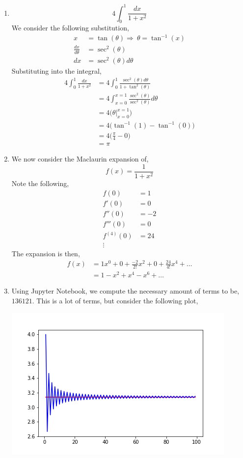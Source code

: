 \documentclass[letterpaper,10pt]{article}
\begin{document}
\begin{enumerate}
\begin{enumerate}
\item \[4\int_0^1\frac{dx}{1+x^2}\]
We consider the following substitution,
\begin{align*}
x&=\tan(\theta)\Rightarrow\ \theta=\tan^{-1}(x) \\
\frac{dx}{d\theta}&=\sec^2(\theta)\\
dx&=\sec^2(\theta)d\theta
\end{align*}
Substituting into the integral,
\begin{align*}
4\int_0^1\frac{dx}{1+x^2} &= 4\int_0^1\frac{\sec^2(\theta)d\theta}{1+\tan^2(\theta)}\\
&=4\int_{x=0}^{x=1}\frac{\sec^2(\theta)}{\sec^2(\theta)}d\theta\\
&=4\bigg(\theta\big|_{x=0}^{x=1}\bigg)\\
&=4\big(\tan^{-1}(1)-\tan^{-1}(0)\big)\\
&=4\bigg(\frac{\pi}{4}-0\bigg)\\
&=\pi
\end{align*}
\item We now consider the Maclaurin expansion of,
\[f(x)=\frac{1}{1+x^2}\]
Note the following,
\begin{align*}
f(0) &= 1\\
f'(0)&=0\\
f''(0)&=-2\\
f'''(0)&= 0\\
f^{(4)}(0)&=24\\
\vdots
\end{align*}
The expansion is then,
\begin{align*}
f(x)&=1x^0+0+\frac{-2}{2!}x^2+0+\frac{24}{4!}x^4+\ldots\\
&=1-x^2+x^4-x^6+\ldots
\end{align*}
\item Using Jupyter Notebook, we compute the necessary amount of terms to be, $136121$. This is a lot of terms, but consider the following plot,
\begin{center}
\includegraphics[scale=.75]{3c.png}

\end{center}
\end{enumerate}
\end{enumerate}
\end{document}
